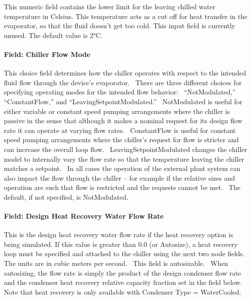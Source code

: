 This numeric field contains the lower limit for the leaving chilled water temperature in Celsius. This temperature acts as a cut off for heat transfer in the evaporator, so that the fluid doesn't get too cold. This input field is currently unused. The default value is 2°C.

\paragraph{Field: Chiller Flow Mode}\label{field-chiller-flow-mode-4}

This choice field determines how the chiller operates with respect to the intended fluid flow through the device's evaporator.~ There are three different choices for specifying operating modes for the intended flow behavior:~ ``NotModulated,'' ``ConstantFlow,'' and ``LeavingSetpointModulated.''~ NotModulated is useful for either variable or constant speed pumping arrangements where the chiller is passive in the sense that although it makes a nominal request for its design flow rate it can operate at varying flow rates.~ ConstantFlow is useful for constant speed pumping arrangements where the chiller's request for flow is stricter and can increase the overall loop flow.~ LeavingSetpointModulated changes the chiller model to internally vary the flow rate so that the temperature leaving the chiller matches a setpoint.~ In all cases the operation of the external plant system can also impact the flow through the chiller -- for example if the relative sizes and operation are such that flow is restricted and the requests cannot be met.~ The default, if not specified, is NotModulated.

\paragraph{Field: Design Heat Recovery Water Flow Rate}\label{field-design-heat-recovery-water-flow-rate-1-000}

This is the design heat recovery water flow rate if the heat recovery option is being simulated. If this value is greater than 0.0 (or Autosize), a heat recovery loop must be specified and attached to the chiller using the next two node fields. The units are in cubic meters per second.~ This field is autosizable.~ When autosizing, the flow rate is simply the product of the design condenser flow rate and the condenser heat recovery relative capacity fraction set in the field below. Note that heat recovery is only available with Condenser Type = WaterCooled.

